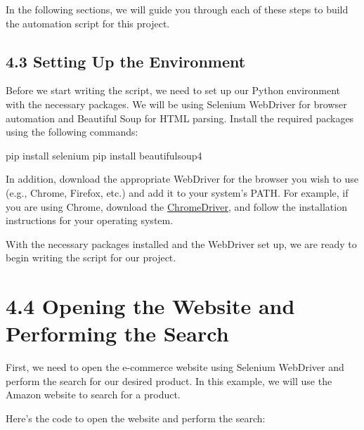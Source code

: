 \documentclass[
  paper=a4,
  ,captions=tableheading
]{scrartcl}
\newenvironment{Shaded}{}{}
\newcommand{\ExtensionTok}[1]{#1}
\newcommand{\NormalTok}[1]{#1}
\begin{document}
In the following sections, we will guide you through each of these steps
to build the automation script for this project.

\hypertarget{setting-up-the-environment}{%
\subsection{4.3 Setting Up the
Environment}\label{setting-up-the-environment}}

Before we start writing the script, we need to set up our Python
environment with the necessary packages. We will be using Selenium
WebDriver for browser automation and Beautiful Soup for HTML parsing.
Install the required packages using the following commands:

\begin{Shaded}
\begin{Highlighting}[]
\ExtensionTok{pip}\NormalTok{ install selenium}
\ExtensionTok{pip}\NormalTok{ install beautifulsoup4}
\end{Highlighting}
\end{Shaded}

In addition, download the appropriate WebDriver for the browser you wish
to use (e.g., Chrome, Firefox, etc.) and add it to your system's PATH.
For example, if you are using Chrome, download the
\href{https://sites.google.com/a/chromium.org/chromedriver/downloads}{ChromeDriver},
and follow the installation instructions for your operating system.

With the necessary packages installed and the WebDriver set up, we are
ready to begin writing the script for our project.

\hypertarget{opening-the-website-and-performing-the-search}{%
\section{4.4 Opening the Website and Performing the
Search}\label{opening-the-website-and-performing-the-search}}

First, we need to open the e-commerce website using Selenium WebDriver
and perform the search for our desired product. In this example, we will
use the Amazon website to search for a product.

Here's the code to open the website and perform the search:
\end{document}
